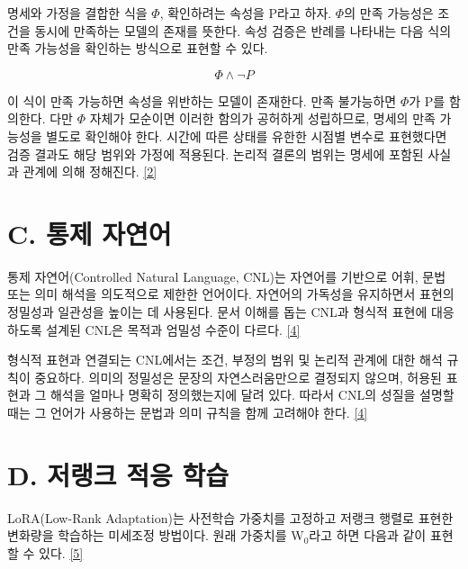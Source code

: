 \documentclass[11pt,a4paper]{article}
\begin{document}
명세와 가정을 결합한 식을 \ensuremath{\Phi}, 확인하려는 속성을 P라고 하자. \ensuremath{\Phi}의 만족 가능성은 조건을 동시에 만족하는 모델의 존재를 뜻한다. 속성 검증은 반례를 나타내는 다음 식의 만족 가능성을 확인하는 방식으로 표현할 수 있다.\par

\[\Phi \land \neg P\]

이 식이 만족 가능하면 속성을 위반하는 모델이 존재한다. 만족 불가능하면 \ensuremath{\Phi}가 P를 함의한다. 다만 \ensuremath{\Phi} 자체가 모순이면 이러한 함의가 공허하게 성립하므로, 명세의 만족 가능성을 별도로 확인해야 한다. 시간에 따른 상태를 유한한 시점별 변수로 표현했다면 검증 결과도 해당 범위와 가정에 적용된다. 논리적 결론의 범위는 명세에 포함된 사실과 관계에 의해 정해진다. \href{\detokenize{https://theory.stanford.edu/~barrett/pubs/BT18.pdf}}{[2]}\par

\section*{C. 통제 자연어}

통제 자연어(Controlled Natural Language, CNL)는 자연어를 기반으로 어휘, 문법 또는 의미 해석을 의도적으로 제한한 언어이다. 자연어의 가독성을 유지하면서 표현의 정밀성과 일관성을 높이는 데 사용된다. 문서 이해를 돕는 CNL과 형식적 표현에 대응하도록 설계된 CNL은 목적과 엄밀성 수준이 다르다. \href{\detokenize{https://aclanthology.org/J14-1005/}}{[4]}\par

형식적 표현과 연결되는 CNL에서는 조건, 부정의 범위 및 논리적 관계에 대한 해석 규칙이 중요하다. 의미의 정밀성은 문장의 자연스러움만으로 결정되지 않으며, 허용된 표현과 그 해석을 얼마나 명확히 정의했는지에 달려 있다. 따라서 CNL의 성질을 설명할 때는 그 언어가 사용하는 문법과 의미 규칙을 함께 고려해야 한다. \href{\detokenize{https://aclanthology.org/J14-1005/}}{[4]}\par

\newpage
{}\section*{D. 저랭크 적응 학습}

LoRA(Low-Rank Adaptation)는 사전학습 가중치를 고정하고 저랭크 행렬로 표현한 변화량을 학습하는 미세조정 방법이다. 원래 가중치를 W\ensuremath{{}_0}라고 하면 다음과 같이 표현할 수 있다. \href{\detokenize{https://arxiv.org/abs/2106.09685}}{[5]}\par
\end{document}
